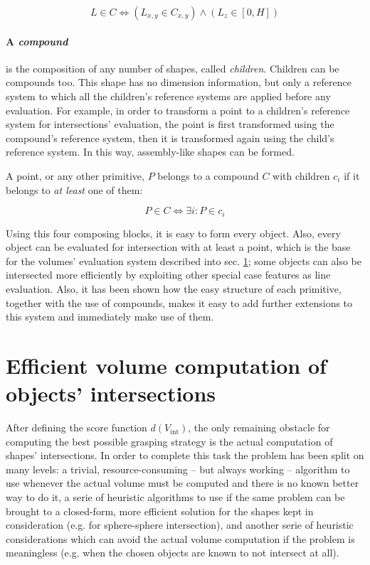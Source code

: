 \begin{equation}
  L \in C \Leftrightarrow
  \left(L_{x,y} \in C_{x,y} \right)
  \wedge
  \left(L_{z} \in [0,H] \right)
\end{equation}

\paragraph{A \emph{compound}} is the composition of any number of shapes, called
\emph{children}. Children can be compounds too. This shape has no dimension
information, but only a reference system to which all the children's reference
systems are applied before any evaluation. For example, in order to transform a
point to a children's reference system for intersections' evaluation, the point
is first transformed using the compound's reference system, then it is
transformed again using the child's reference system. In this way, assembly-like
shapes can be formed.

A point, or any other primitive, $P$ belongs to a compound $C$ with children $c_i$ if it belongs to
\emph{at least} one of them:

\begin{equation}
  P \in C \Leftrightarrow \exists i : P \in c_i
\end{equation}

Using this four composing blocks, it is easy to form every object. Also, every
object can be evaluated for intersection with at least a point, which is the
base for the volumes' evaluation system described into sec.
\ref{sec:grasp_computing}; some objects can also be intersected more efficiently by
exploiting other special case features as line evaluation. Also, it has been
shown how the easy structure of each primitive, together with the use of
compounds, makes it easy to add further extensions to this system and immediately
make use of them.

\section{Efficient volume computation of objects' intersections} \label{sec:grasp_computing}
After defining the score function $d(V_{\text{int}})$, the only remaining
obstacle for computing the best possible grasping strategy is the actual
computation of shapes' intersections. In order to complete this task the problem
has been split on many levels: a trivial, resource-consuming -- but always
working -- algorithm to use whenever the actual volume must be computed and
there is no known better way to do it, a serie of heuristic algorithms to use if
the same problem can be brought to a closed-form, more efficient solution for
the shapes kept in consideration (e.g. for sphere-sphere intersection), and
another serie of heuristic considerations which can avoid the actual volume
computation if the problem is meaningless (e.g. when the chosen objects are
known to not intersect at all). 

